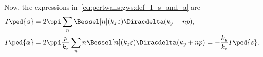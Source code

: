 Now, the expressions in~\cref{eq:pertwalls:gws:def_I_s_and_a} are
\begin{subequations}\label{eq:derivations:jacobianger:I_s_and_a}
    \begin{align}
        I\ped{s} %
        & = 2\ppi \sum_{n}  \Bessel[n](k_z \varepsilon) \Diracdelta(k_y + np),\label{eq:derivations:jacobianger:I_s_only} \\
        I\ped{a} %
        & = 2\ppi \frac{p}{k_z} \sum_{n} n \Bessel[n](k_z \varepsilon) \Diracdelta(k_y + np) = - \frac{k_y}{k_z}I\ped{s}.\label{eq:derivations:jacobianger:I_a_only}
    \end{align}
\end{subequations}


